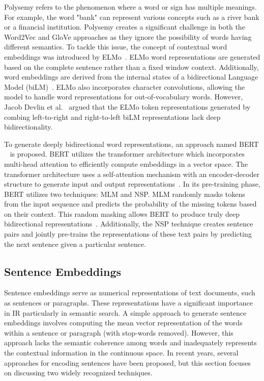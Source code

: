 Polysemy refers to the phenomenon where a word or sign has multiple meanings. For example, the word "bank" can represent various concepts such as a river bank or a financial institution. Polysemy creates a significant challenge in both the Word2Vec and \ac{GloVe} approaches as they ignore the possibility of words having different semantics. To tackle this issue, the concept of contextual word embeddings was introduced by \ac{ELMo}~\cite{peters2018deep}. \ac{ELMo} word representations are generated based on the complete sentence rather than a fixed window context. Additionally, word embeddings are derived from the internal states of a bidirectional Language Model (biLM)~\cite{peters2018deep}. \ac{ELMo} also incorporates character convolutions, allowing the model to handle word representations for out-of-vocabulary words. However, Jacob Devlin et al.~\cite{devlin2018bert} argued that the \ac{ELMo} token representations generated by combing left-to-right and right-to-left biLM representations lack deep bidirectionality.


To generate deeply bidirectional word representations, an approach named \ac{BERT} ~\cite{devlin2018bert} is proposed. \ac{BERT} utilizes the transformer architecture which incorporates multi-head attention to efficiently compute embeddings in a vector space. The transformer architecture uses a self-attention mechanism with an encoder-decoder structure to generate input and output representations~\cite{vaswani2017attention}. In its pre-training phase, \ac{BERT} utilizes two techniques: \ac{MLM} and \ac{NSP}. \ac{MLM} randomly masks tokens from the input sequence and predicts the probability of the missing tokens based on their context. This random masking allows \ac{BERT} to produce truly deep bidirectional representations~\cite{devlin2018bert}. Additionally, the \ac{NSP} technique creates sentence pairs and jointly pre-trains the representations of these text pairs by predicting the next sentence given a particular sentence.


\subsection{Sentence Embeddings}

Sentence embeddings serve as numerical representations of text documents, such as sentences or paragraphs. These representations have a significant importance in \ac{IR} particularly in semantic search. A simple approach to generate sentence embeddings involves computing the mean vector representation of the words within a sentence or paragraph (with stop-words removed). However, this approach lacks the semantic coherence among words and inadequately represents the contextual information in the continuous space. In recent years, several approaches for encoding sentences have been proposed, but this section focuses on discussing two widely recognized techniques.

